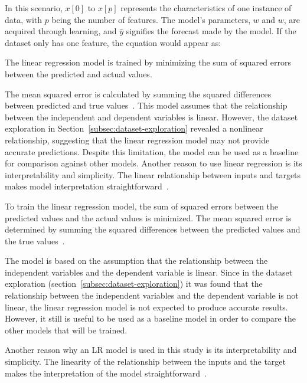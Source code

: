 In this scenario, $x[0]$ to $x[p]$ represents the characteristics of one instance of data, with $p$ being the number of
features.
The model's parameters, $w$ and $w$, are acquired through learning, and $\hat{y}$ signifies the forecast made by the
model.
If the dataset only has one feature, the equation would appear as:

The linear regression model is trained by minimizing the sum of squared errors between the predicted and actual
values.

The mean squared error is calculated by summing the squared differences between predicted and true
values~\cite[p. 47--68]{muller_introductionmachinelearning_2016}.
This model assumes that the relationship between the independent and dependent variables is linear.
However, the dataset exploration in Section~\ref{subsec:dataset-exploration} revealed
a nonlinear relationship, suggesting that the linear regression model may not provide accurate predictions.
Despite this limitation, the model can be used as a baseline for comparison against other models.
Another reason to use linear regression is its interpretability and simplicity.
The linear relationship between inputs and targets makes model interpretation
straightforward~\cite[p. 37]{molnar2020interpretable}.

To train the linear regression model, the sum of squared errors between the predicted values and
the actual values is minimized.
The mean squared error is determined by summing the squared differences between the predicted
values and the true values~\cite[p. 47--68]{muller_introductionmachinelearning_2016}.

The model is based on the assumption that the relationship between the independent
variables and the dependent variable is linear.
Since in the dataset exploration (section~\ref{subsec:dataset-exploration}) it was found that the relationship
between the independent variables and the dependent variable is not linear, the linear regression model
is not expected to produce accurate results.
However, it still is useful to be used as a baseline model in order to compare the other models that will be trained.

Another reason why an \ac{LR} model is used in this study is its interpretability and simplicity.
The linearity of the relationship between the inputs and the target makes the
interpretation of the model straightforward~\cite[p. 37]{molnar2020interpretable}.

